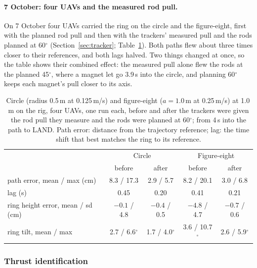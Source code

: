 \paragraph{7 October: four UAVs and the measured rod pull.} On 7 October four UAVs carried the ring on the
circle and the figure-eight, first with the planned rod pull and then with the trackers' measured pull and the
rods planned at 60$^\circ$ (Section~\ref{sec:tracker}; Table~\ref{tab:rig_oct7}). Both paths flew about three
times closer to their references, and both lags halved. Two things changed at once, so the table shows their
combined effect: the measured pull alone flew the rods at the planned 45$^\circ$, where a magnet let go 3.9\,s
into the circle, and planning 60$^\circ$ keeps each magnet's pull closer to its axis.

\begin{table}[h]
\centering
\small
\caption{Circle (radius 0.5\,m at 0.125\,m/s) and figure-eight ($a = 1.0$\,m at 0.25\,m/s) at 1.0\,m on the
rig, four UAVs, one run each, before and after the trackers were given the rod pull they measure and the rods
were planned at 60$^\circ$; from 4\,s into the path to LAND. Path error: distance from the trajectory reference;
lag: the time shift that best matches the ring to its reference.}
\label{tab:rig_oct7}
\begin{tabularx}{\textwidth}{>{\raggedright\arraybackslash}Xcccc}
\toprule
 & \multicolumn{2}{c}{Circle} & \multicolumn{2}{c}{Figure-eight} \\
 & before & after & before & after \\
\midrule
path error, mean / max (cm) & 8.3 / 17.3 & 2.9 / 5.7 & 8.2 / 20.1 & 3.0 / 6.8 \\
lag (s) & 0.45 & 0.20 & 0.41 & 0.21 \\
ring height error, mean / sd (cm) & $-0.1$ / 4.8 & $-0.4$ / 0.5 & $-4.8$ / 4.7 & $-0.7$ / 0.6 \\
ring tilt, mean / max & 2.7 / 6.6$^\circ$ & 1.7 / 4.0$^\circ$ & 3.6 / 10.7$^\circ$ & 2.6 / 5.9$^\circ$ \\
\bottomrule
\end{tabularx}
\end{table}

\subsubsection{Thrust identification}
\label{sec:thrust_id}

